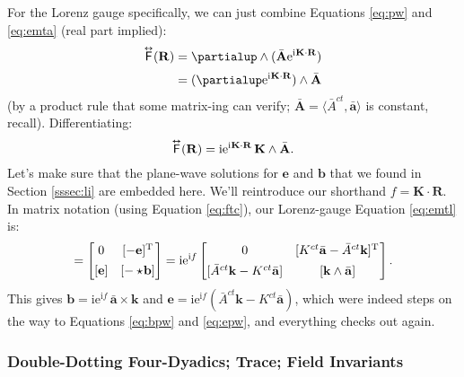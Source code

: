 \documentclass[12pt]{article}
\renewcommand{\vv}[1]{\mathbf{#1}}
\newcommand{\capdy}[1]{ \overset{ \text{\tiny$\bm\leftrightarrow$} }{\vphantom{\text{\small{A}}}\smash{#1}} }
\begin{document}
For the Lorenz gauge specifically, we can just combine Equations \ref{eq:pw} and \ref{eq:emta} (real part implied):
\begin{equation*}
\begin{split}
\capdy{\mathsf{F}} (\vv R) &= \partialup \wedge (  \bar{\vv A} \mathrm{e}^{\mathrm{i} \mkern.5mu \vv K \cdot \vv R} ) \\[2pt]
&= ( \partialup \mathrm{e}^{\mathrm{i} \mkern.5mu \vv K \cdot \vv R} ) \wedge \bar{\vv A}
\end{split}
\end{equation*}
(by a product rule that some matrix-ing can verify; $\bar{\vv A} = \langle \bar{A}^{ct}, \bar{\vv a} \rangle$ is constant, recall). Differentiating:
\begin{equation}\label{eq:emtl}
\capdy{\mathsf{F}} (\vv R) = \mathrm{i} \mathrm{e}^{\mathrm{i} \mkern.5mu \vv K \cdot \vv R} \, \vv K \wedge \bar{\vv A} .
\end{equation}
Let's make sure that the plane-wave solutions for $\vv e$ and $\vv b$ that we found in Section \ref{sssec:li} are embedded here. We'll reintroduce our shorthand $f = \vv K \cdot \vv R$. In matrix notation (using Equation \ref{eq:ftc}), our Lorenz-gauge Equation \ref{eq:emtl} is:
\begin{equation*}
[ \capdy{\mathsf{F}} ]
=
\begin{bmatrix}
0 & [ - \vv e]^\mathrm{T} \\[1ex]
[\vv e] & [ - \star \mkern-3mu \vv b ]
\end{bmatrix}
=
\mathrm{i} \mathrm{e}^{\mathrm{i} f}
\begin{bmatrix}
0 & [K^{ct} \bar{\vv a} - \bar{A}^{ct} \vv k ]^\mathrm{T} \mkern1mu \\[1ex]
[\bar{A}^{ct} \vv k - K^{ct} \bar{\vv a}] & [ \vv k \wedge \bar{\vv a} ] 
\end{bmatrix} .
\end{equation*}
This gives $\vv b = \mathrm{i} \mathrm{e}^{\mathrm{i} f} \, \bar{\vv a} \times \vv k$ and $\vv e = \mathrm{i} \mathrm{e}^{\mathrm{i} f} ( \bar{A}^{ct} \vv k - K^{ct} \bar{\vv a} )$, which were indeed steps on the way to Equations \ref{eq:bpw} and \ref{eq:epw}, and everything checks out again.


\subsubsection{Double-Dotting Four-Dyadics; Trace; Field Invariants}\label{sssec:dd}
\end{document}
